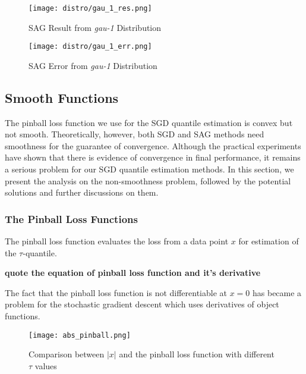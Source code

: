 \begin{figure}[H]
    \centering
	\texttt{[image: distro/gau\_1\_res.png]}
    \caption{SAG Result from \textit{gau-1} Distribution}
    \label{fig: sag_res}
\end{figure}

\begin{figure}[H]
    \centering
	\texttt{[image: distro/gau\_1\_err.png]}
    \caption{SAG Error from \textit{gau-1} Distribution}
    \label{fig: sag_err}

\end{figure}


\subsection{Smooth Functions}
\label{subsec: smooth_func}
The pinball loss function we use for the SGD quantile estimation is convex but not smooth. 
Theoretically, however, both SGD and SAG methods need smoothness for the guarantee of convergence. Although the practical experiments have shown that there is evidence of convergence in final performance, it remains a serious problem for our SGD quantile estimation methods. In this section, we present the analysis on the non-smoothness problem, followed by the potential solutions and further discussions on them.

\subsubsection{The Pinball Loss Functions}
\graphicspath{{Figures/Stepsize_adapt/Smooth_func/}{./}} 

The pinball loss function evaluates the loss from a data point $x$ for estimation of the $\tau$-quantile.

\textbf{quote the equation of pinball loss function and it's derivative}

The fact that the pinball loss function is not differentiable at $x= 0$ has became a problem for the stochastic gradient descent which uses derivatives of object functions.

\begin{figure*}[h!]
	\texttt{[image: abs\_pinball.png]}
	\caption{Comparison between $|x|$ and the pinball loss function with different $\tau$ values}
\end{figure*}


